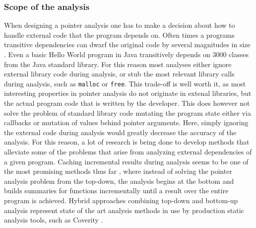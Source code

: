 \subsubsection{Scope of the analysis}
When designing a pointer analysis one has to make a decision about how to handle external code that the program depends on.
Often times a programs transitive dependencies can dwarf the original code by several magnitudes in size \cite{toman2017taming}.
Even a basic Hello World program in Java transitively depends on 3000 classes \cite{kulkarni2016accelerating} from the Java standard library.
For this reason most analyses either ignore external library code during analysis, or stub the most relevant library calls during analysis, such as \verb|malloc| or \verb|free|.
This trade-off is well worth it, as most interesting properties in pointer analysis do not originate in extenal libraries, but the actual program code that is written by the developer.
This does however not solve the problem of standard library code mutating the program state either via callbacks or mutation of values behind pointer arguments. Here, simply ignoring the external code during analysis would greatly decrease the accuracy of the analysis.
For this reason, a lot of research is being done to develop methods that alleviate some of the problems that arise from analyzing external dependencies of a given program. Caching incremental results during analysis seems to be one of the most promising methods thus far \cite{mcpeak2013scalable}, where instead of solving the pointer analysis problem from the top-down, the analysis begins at the bottom and builds summaries for functions incrementally until a result over the entire program is achieved. Hybrid approaches combining top-down and bottom-up analysis represent state of the art analysis methods in use by production static analysis tools, such as Coverity \cite{mcpeak2013scalable}.

